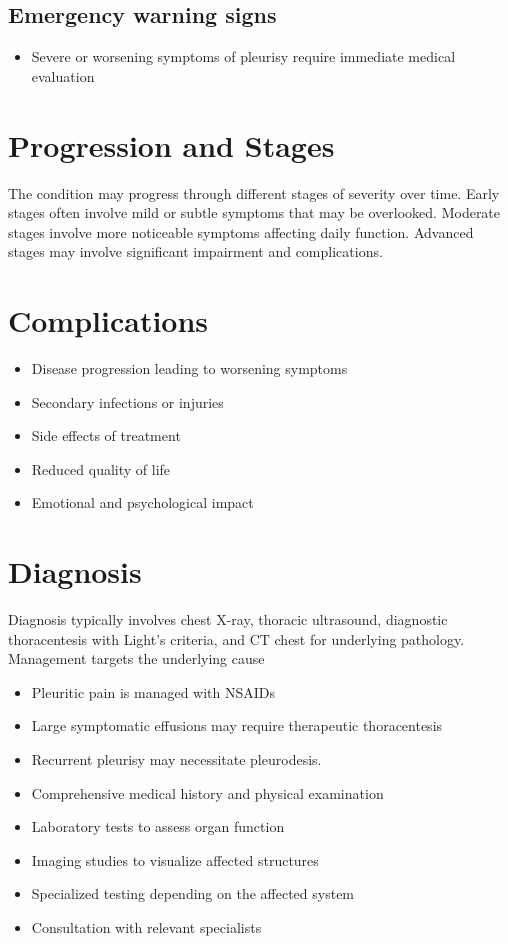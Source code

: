\subsection{Emergency warning signs}
\begin{itemize}[noitemsep]
  \item Severe or worsening symptoms of pleurisy require immediate medical evaluation
\end{itemize}
\section{Progression and Stages}
The condition may progress through different stages of severity over time. Early stages often involve mild or subtle symptoms that may be overlooked. Moderate stages involve more noticeable symptoms affecting daily function. Advanced stages may involve significant impairment and complications.
\section{Complications}
\begin{itemize}[noitemsep]
  \item Disease progression leading to worsening symptoms
  \item Secondary infections or injuries
  \item Side effects of treatment
  \item Reduced quality of life
  \item Emotional and psychological impact
\end{itemize}
\section{Diagnosis}
Diagnosis typically involves chest X-ray, thoracic ultrasound, diagnostic thoracentesis with Light's criteria, and CT chest for underlying pathology. Management targets the underlying cause

\begin{itemize}[noitemsep]
  \item Pleuritic pain is managed with NSAIDs
  \item Large symptomatic effusions may require therapeutic thoracentesis
  \item Recurrent pleurisy may necessitate pleurodesis.
  \item Comprehensive medical history and physical examination
  \item Laboratory tests to assess organ function
  \item Imaging studies to visualize affected structures
  \item Specialized testing depending on the affected system
  \item Consultation with relevant specialists
\end{itemize}
